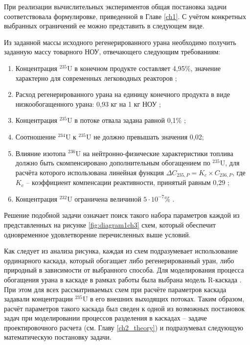 При реализации вычислительных экспериментов общая постановка задачи соответствовала формулировке, приведенной в Главе \ref{ch1}. С учётом конкретных выбранных ограничений ее можно представить в следующем виде.

Из заданной массы исходного регенерированного урана необходимо получить заданную массу товарного НОУ, отвечающего следующим требованиям:

\begin{enumerate}
  \item Концентрация $^{235}$U в конечном продукте составляет 4,95\%, значение характерно для современных легководных реакторов \cite{solovevaCennostiOYaTKak2019};
  \item Расход регенерированного урана на единицу конечного продукта в виде низкообогащенного урана: 0,93 кг на 1 кг НОУ \cite{smirnovApplyingEnrichmentCapacities2018};
  \item Концентрация $^{235}$U в потоке отвала задана равной 0,1\% \cite{smirnovEvolutionIsotopicComposition2012};
  \item Соотношение $^{234}$U к $^{235}$U не должно превышать значения 0,02;
  \item Влияние изотопа $^{236}$U на нейтронно-физические характеристики топлива должно быть скомпенсировано дополнительным обогащением по $^{235}$U, для расчёта которого использована линейная функция $\Delta C_{235,P}=K_{c}\times C_{236,P}$, где $K_{c}$ -- коэффициент компенсации реактивности, принятый равным 0,29 \cite{smirnovApplyingEnrichmentCapacities2018};
  \item Концентрация $^{232}$U ограничена величиной $5\cdot10^{-7}$\% \cite{smirnovApplyingEnrichmentCapacities2018}.
\end{enumerate}

Решение подобной задачи означает поиск такого набора параметров каждой из представленных на рисунке \ref{fig:diagram1ch3} схем, который обеспечит одновременное удовлетворение перечисленных выше условий. 

Как следует из анализа рисунка, каждая из схем подразумевает использование ординарного каскада, который обогащает либо регенерированный уран, либо природный в зависимости от выбранного способа. Для моделирования процесса обогащения урана в каскаде в рамках работы была выбрана модель R-каскада \cite{sulaberidzeTeoriyaKaskadovDlya2011}. При этом для всех рассматриваемых схем при расчёте параметров каскада задавали концентрации $^{235}$U в его внешних выходящих потоках. Таким образом, расчёт параметров такого каскада был сведен к одной из возможных постановок задач при моделировании процессов разделения в каскадах -- задаче проектировочного расчета (см. Главу \ref{ch2_theory}) и подразумевал следующую математическую постановку задачи. 

